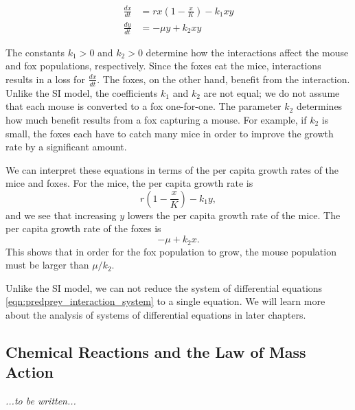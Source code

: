 \documentclass[reqno]{immbook}
\numberwithin{equation}{chapter}
\numberwithin{question}{section}
\numberwithin{theorem}{chapter}
\numberwithin{figure}{chapter}
\theoremstyle{definition}
\begin{document}
\begin{equation}
\begin{split}
   \frac{dx}{dt} & = rx\left(1-\frac{x}{K}\right) - k_1xy \\
   \frac{dy}{dt} & = -\mu y + k_2xy
\end{split}
\label{eqn:predprey_interaction_system}
\end{equation}

The constants $k_1 > 0$ and $k_2 > 0$ determine how the
interactions affect the mouse and fox populations, respectively.
Since the foxes eat the mice, interactions results
in a loss for $\frac{dx}{dt}$.
The foxes, on the other hand, benefit from the interaction.
Unlike the SI model, the coefficients $k_1$ and $k_2$
are not equal; we do not assume that
each mouse is converted to a fox one-for-one.
The parameter $k_2$ determines
how much benefit results from a fox capturing a mouse.
For example, if $k_2$ is small, 
the foxes each have to catch many mice in order to improve
the growth rate by a significant amount.

We can interpret these equations in terms of the
per capita growth rates of the mice and foxes.
For the mice, the per capita growth rate
is
\begin{equation}
      r\left(1-\frac{x}{K}\right)-k_1 y,
\end{equation}
and we see that increasing
$y$ lowers the per capita growth rate of the
mice.
The per capita growth rate of the foxes
is
\begin{equation}
-\mu + k_2 x.
\end{equation}
This shows that in order
for the fox population to grow, the mouse 
population must be larger than $\mu/k_2$.

Unlike the SI model, we can not reduce the system
of differential equations
\eqref{eqn:predprey_interaction_system}
to a single equation.
We will learn more about the analysis of systems
of differential equations in later chapters.

\subsection{Chemical Reactions and the Law of Mass Action}

\emph{...to be written...}

\newpage
\end{document}
